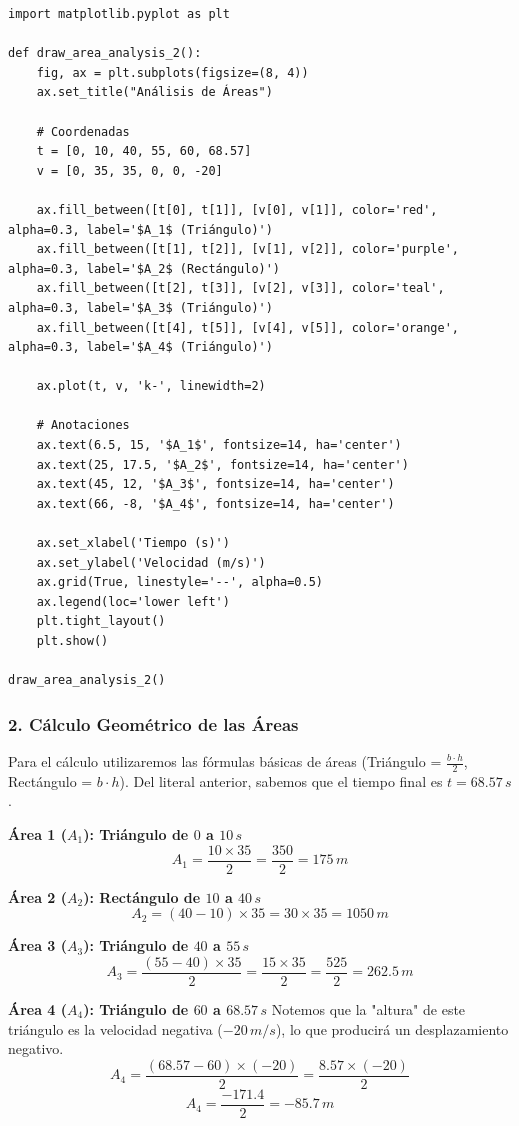 \documentclass[12pt, a4paper]{article}
\begin{document}
\begin{lstlisting}
import matplotlib.pyplot as plt

def draw_area_analysis_2():
    fig, ax = plt.subplots(figsize=(8, 4))
    ax.set_title("Análisis de Áreas")
    
    # Coordenadas
    t = [0, 10, 40, 55, 60, 68.57]
    v = [0, 35, 35, 0, 0, -20]
    
    ax.fill_between([t[0], t[1]], [v[0], v[1]], color='red', alpha=0.3, label='$A_1$ (Triángulo)')
    ax.fill_between([t[1], t[2]], [v[1], v[2]], color='purple', alpha=0.3, label='$A_2$ (Rectángulo)')
    ax.fill_between([t[2], t[3]], [v[2], v[3]], color='teal', alpha=0.3, label='$A_3$ (Triángulo)')
    ax.fill_between([t[4], t[5]], [v[4], v[5]], color='orange', alpha=0.3, label='$A_4$ (Triángulo)')
    
    ax.plot(t, v, 'k-', linewidth=2)
    
    # Anotaciones
    ax.text(6.5, 15, '$A_1$', fontsize=14, ha='center')
    ax.text(25, 17.5, '$A_2$', fontsize=14, ha='center')
    ax.text(45, 12, '$A_3$', fontsize=14, ha='center')
    ax.text(66, -8, '$A_4$', fontsize=14, ha='center')

    ax.set_xlabel('Tiempo (s)')
    ax.set_ylabel('Velocidad (m/s)')
    ax.grid(True, linestyle='--', alpha=0.5)
    ax.legend(loc='lower left')
    plt.tight_layout()
    plt.show()

draw_area_analysis_2()
\end{lstlisting}

\subsubsection*{2. Cálculo Geométrico de las Áreas}
Para el cálculo utilizaremos las fórmulas básicas de áreas (Triángulo = $\frac{b \cdot h}{2}$, Rectángulo = $b \cdot h$). Del literal anterior, sabemos que el tiempo final es $t = 68.57 \, \si{s}$.

\textbf{Área 1 ($A_1$): Triángulo de $0$ a $10 \, \si{s}$}
$$ A_1 = \frac{10 \times 35}{2} = \frac{350}{2} = 175 \, \si{m} $$

\textbf{Área 2 ($A_2$): Rectángulo de $10$ a $40 \, \si{s}$}
$$ A_2 = (40 - 10) \times 35 = 30 \times 35 = 1050 \, \si{m} $$

\textbf{Área 3 ($A_3$): Triángulo de $40$ a $55 \, \si{s}$}
$$ A_3 = \frac{(55 - 40) \times 35}{2} = \frac{15 \times 35}{2} = \frac{525}{2} = 262.5 \, \si{m} $$

\textbf{Área 4 ($A_4$): Triángulo de $60$ a $68.57 \, \si{s}$}
Notemos que la "altura" de este triángulo es la velocidad negativa ($-20 \, \si{m/s}$), lo que producirá un desplazamiento negativo.
$$ A_4 = \frac{(68.57 - 60) \times (-20)}{2} = \frac{8.57 \times (-20)}{2} $$
$$ A_4 = \frac{-171.4}{2} = -85.7 \, \si{m} $$
\end{document}
